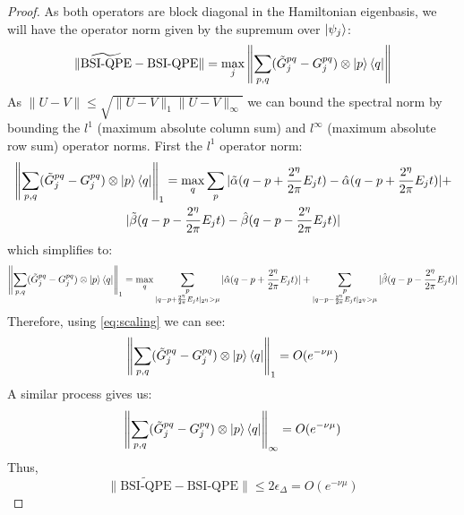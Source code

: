 \documentclass[aps,floatfix,10pt,amssymb,amsfont,amsmath,superscriptaddress,float,nofootinbib,longbibliography,nobalancelastpage,twocolumn]{revtex4-2}
\begin{document}
\begin{proof}
    As both operators are block diagonal in the Hamiltonian eigenbasis, we will have the operator norm given by the supremum over $\ket{\psi_j}$:
    \begin{equation}
        \|\widetilde{\text{BSI-QPE}}-\text{BSI-QPE}\| = \max_j 
        \left\|\sum_{p,q}(\tilde G^{pq}_j - G^{pq}_j) \otimes \ket{p}\bra{q}\right\|
    \end{equation}
    As $\|U-V\| \leq \sqrt{\|U-V\|_{1}\|U-V\|_{\infty}}$ we can bound the spectral norm by bounding the $l^1$ (maximum absolute column sum) and $l^{\infty}$ (maximum absolute row sum) operator norms. First the $l^1$ operator norm:
    \begin{multline}
         \left\|\sum_{p,q}(\tilde G^{pq}_j - G^{pq}_j) \otimes \ket{p}\bra{q}\right\|_1 = \max_q\sum_{p}|\tilde\alpha(q-p+\frac{2^{\eta}}{2\pi}E_jt)-\hat\alpha(q-p+\frac{2^{\eta}}{2\pi}E_jt)|+\\|\tilde\beta (q-p-\frac{2^{\eta}}{2\pi}E_jt)-\hat\beta (q-p-\frac{2^{\eta}}{2\pi}E_jt)|
    \end{multline}
    which simplifies to:
    \begin{equation}
         \left\|\sum_{p,q}(\tilde G^{pq}_j - G^{pq}_j) \otimes \ket{p}\bra{q}\right\|_1 = \max_q\sum_{\substack{p\\|q-p+\frac{2^{\eta}}{2\pi}E_jt|_{2^{\eta}}>\mu}}|\hat\alpha(q-p+\frac{2^{\eta}}{2\pi}E_jt)|+\sum_{\substack{p\\|q-p-\frac{2^{\eta}}{2\pi}E_jt|_{2^{\eta}}>\mu}}|\hat\beta (q-p-\frac{2^{\eta}}{2\pi}E_jt)|
    \end{equation}
    Therefore, using \eqref{eq:scaling} we can see:
    \begin{equation}
        \left\|\sum_{p,q}(\tilde G^{pq}_j - G^{pq}_j) \otimes \ket{p}\bra{q}\right\|_1 = O(e^{-\nu \mu})
    \end{equation}
    A similar process gives us:
    \begin{equation}
        \left\|\sum_{p,q}(\tilde G^{pq}_j - G^{pq}_j) \otimes \ket{p}\bra{q}\right\|_{\infty} =O(e^{-\nu \mu})
    \end{equation}
    Thus,
    \begin{equation}
        \|\widetilde{\text{BSI-QPE}}-\text{BSI-QPE}\| \leq 2\epsilon_{\Delta} = O\left(e^{-\nu \mu}\right)
    \end{equation}
\end{proof}
\end{document}
